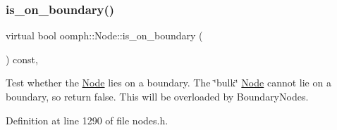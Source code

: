 \mbox{\label{classoomph_1_1Node_a2ca215e42116ee8a2acc7d6a35e37788}} 
\subsubsection{\texorpdfstring{is\+\_\+on\+\_\+boundary()}{is\_on\_boundary()}\hspace{0.1cm}{\footnotesize\ttfamily [1/2]}}
{\footnotesize\ttfamily virtual bool oomph\+::\+Node\+::is\+\_\+on\+\_\+boundary (\begin{DoxyParamCaption}{ }\end{DoxyParamCaption}) const\hspace{0.3cm}{\ttfamily [inline]}, {\ttfamily [virtual]}}



Test whether the \hyperlink{classoomph_1_1Node}{Node} lies on a boundary. The \char`\"{}bulk\char`\"{} \hyperlink{classoomph_1_1Node}{Node} cannot lie on a boundary, so return false. This will be overloaded by Boundary\+Nodes. 



Definition at line 1290 of file nodes.\+h.



